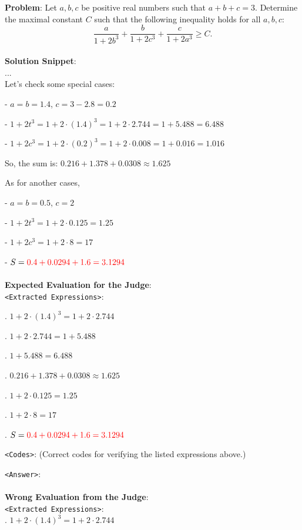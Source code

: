 \begin{examplebox}
\textbf{Problem}: Let $a, b, c$ be positive real numbers such that $a+b+c=3$. Determine the maximal constant $C$ such that the following inequality holds for all $a, b, c$:
$$
\frac{a}{1+2 b^3}+\frac{b}{1+2 c^3}+\frac{c}{1+2 a^3} \geq C.
$$
\\
\textbf{Solution Snippet}: \\
...\\
Let's check some special cases:

\quad - \( a = b = 1.4 \), \( c = 3-2.8 = 0.2 \)

\quad - \( 1+2t^3 = 1+2 \cdot (1.4)^3 = 1+2 \cdot 2.744 = 1+5.488 = 6.488 \)

\quad - \( 1+2c^3 = 1+2 \cdot (0.2)^3 = 1+2 \cdot 0.008 = 1+0.016 = 1.016 \)

So, the sum is: \( 0.216 + 1.378 + 0.0308 \approx 1.625 \)

As for another cases, 

\quad - \( a = b = 0.5 \), \( c = 2 \)

\quad - \( 1+2t^3 = 1+2 \cdot 0.125 = 1.25 \)

\quad - \( 1+2c^3 = 1+2 \cdot 8 = 17 \)

\quad - \(S= {\textcolor{red}{0.4 + 0.0294 + 1.6 = 3.1294}} \)
\\\\
\textbf{Expected Evaluation for the Judge}:
\\
\texttt{<Extracted Expressions>}: 

. $1+2 \cdot (1.4)^3 = 1+2 \cdot 2.744$

. $1+2 \cdot 2.744 = 1+5.488$

. $1+5.488 = 6.488$

. $0.216 + 1.378 + 0.0308 \approx 1.625$

. $1+2 \cdot 0.125 = 1.25$

. $1+2 \cdot 8 = 17$

. $S= {\textcolor{red}{0.4 + 0.0294 + 1.6 = 3.1294}}$

\texttt{<Codes>}: (Correct codes for verifying the listed expressions above.)

\texttt{<Answer>}: 
\\\\
\textbf{Wrong Evaluation from the Judge}: \\
\texttt{<Extracted Expressions>}: \\
. $1+2 \cdot (1.4)^3 = 1+2 \cdot 2.744$


\end{examplebox}
